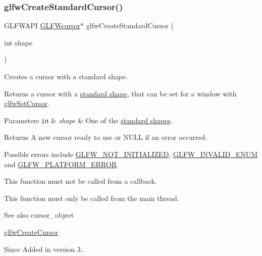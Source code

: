\subsubsection{\texorpdfstring{glfw\+Create\+Standard\+Cursor()}{glfwCreateStandardCursor()}}
{\footnotesize\ttfamily G\+L\+F\+W\+A\+PI \hyperlink{glfw3_8h_a89261ae18c75e863aaf2656ecdd238f4}{G\+L\+F\+Wcursor}$\ast$ glfw\+Create\+Standard\+Cursor (\begin{DoxyParamCaption}\item[{int}]{shape }\end{DoxyParamCaption})}



Creates a cursor with a standard shape. 

Returns a cursor with a \hyperlink{group__shapes}{standard shape}, that can be set for a window with \hyperlink{group__input_gafaf103cea2f43530cff7de4e01126a4f}{glfw\+Set\+Cursor}.


\begin{DoxyParams}[1]{Parameters}
\mbox{\tt in}  & {\em shape} & One of the \hyperlink{group__shapes}{standard shapes}. \\
\hline
\end{DoxyParams}
\begin{DoxyReturn}{Returns}
A new cursor ready to use or {\ttfamily N\+U\+LL} if an error occurred.
\end{DoxyReturn}
Possible errors include \hyperlink{group__errors_ga2374ee02c177f12e1fa76ff3ed15e14a}{G\+L\+F\+W\+\_\+\+N\+O\+T\+\_\+\+I\+N\+I\+T\+I\+A\+L\+I\+Z\+ED}, \hyperlink{group__errors_ga76f6bb9c4eea73db675f096b404593ce}{G\+L\+F\+W\+\_\+\+I\+N\+V\+A\+L\+I\+D\+\_\+\+E\+N\+UM} and \hyperlink{group__errors_gad44162d78100ea5e87cdd38426b8c7a1}{G\+L\+F\+W\+\_\+\+P\+L\+A\+T\+F\+O\+R\+M\+\_\+\+E\+R\+R\+OR}.

This function must not be called from a callback.

This function must only be called from the main thread.

\begin{DoxySeeAlso}{See also}
cursor\+\_\+object 

\hyperlink{group__input_gac0f0f691f2d110f9acfb4bfe07f1216c}{glfw\+Create\+Cursor}
\end{DoxySeeAlso}
\begin{DoxySince}{Since}
Added in version 3.. 
\end{DoxySince}
\mbox{\label{group__input_ga27556b7122117bc1bbb4bb3cc003ea43}} 
